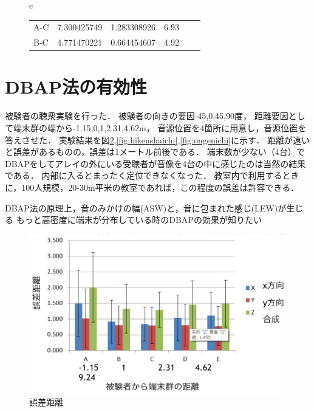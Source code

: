 \begin{figure}[p]
\begin{center}
\begin{tabular}{c}
\begin{minipage}{0.68\hsize}
\begin{center}
\begin{tabular}{l|rrrrr}
            {\footnotesize A-C }&{\footnotesize 7.300425749}&{\footnotesize 1.283308926}&{\footnotesize 6.93 }\\
            {\footnotesize B-C }&{\footnotesize 4.771470221}&{\footnotesize 0.664454607}&{\footnotesize 4.92 }\\
            \hline
          \end{tabular}
          \label{tab:estdistance}
        \end{center}
      \end{minipage}
    \end{tabular}
  \end{center}
\end{figure}



\section{DBAP法の有効性}

被験者の聴衆実験を行った．
被験者の向きの要因-45,0,45,90度，
距離要因として端末群の端から-1.15,0,1,2.31,4.62m，
音源位置を4箇所に用意し，音源位置を答えさせた．
実験結果を図\ref{fig:gosa},\ref{fig:hikenshaichi},\ref{fig:ongenichi}に示す．
距離が遠いと誤差があるものの，誤差は1メートル前後である．
端末数が少ない（4台）でDBAPをしてアレイの外にいる受聴者が音像を4台の中に感じたのは当然の結果である．
内部に入るとまったく定位できなくなった．
教室内で利用するときに，100人規模，20-30m平米の教室であれば，この程度の誤差は許容できる．


DBAP法の原理上，音のみかけの幅(ASW)と，音に包まれた感じ(LEW)が生じる\cite{ku-kanonkyo, onbasaigen, onkyoukougaku, 森本政之, 森本政之09, 森本政之90, 森本政之93, 崔瑛芝, 上杉信敏, 田中雅史}
もっと高密度に端末が分布している時のDBAPの効果が知りたい


\begin{figure}[p]
  \centering
  \includegraphics[clip,width=1.05\hsize]{img/bougurahu.png}
  \caption{誤差距離}\label{fig:gosa}
\end{figure}


